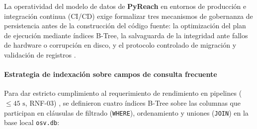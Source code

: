 La operatividad del modelo de datos de \textbf{PyReach} en entornos de producción e integración continua (CI/CD) exige formalizar tres mecanismos de gobernanza de persistencia antes de la construcción del código fuente: la optimización del plan de ejecución mediante índices B-Tree, la salvaguarda de la integridad ante fallos de hardware o corrupción en disco, y el protocolo controlado de migración y validación de registros \cite{torres2026proyecto, pressman2020software}.

\paragraph*{Estrategia de indexación sobre campos de consulta frecuente}
Para dar estricto cumplimiento al requerimiento de rendimiento en pipelines ($\le 45\text{ s}$, RNF-03) \cite{torres2026proyecto, humble2010continuous}, se definieron cuatro índices B-Tree sobre las columnas que participan en cláusulas de filtrado (\texttt{WHERE}), ordenamiento y uniones (\texttt{JOIN}) en la base local \texttt{osv.\allowbreak db}:

